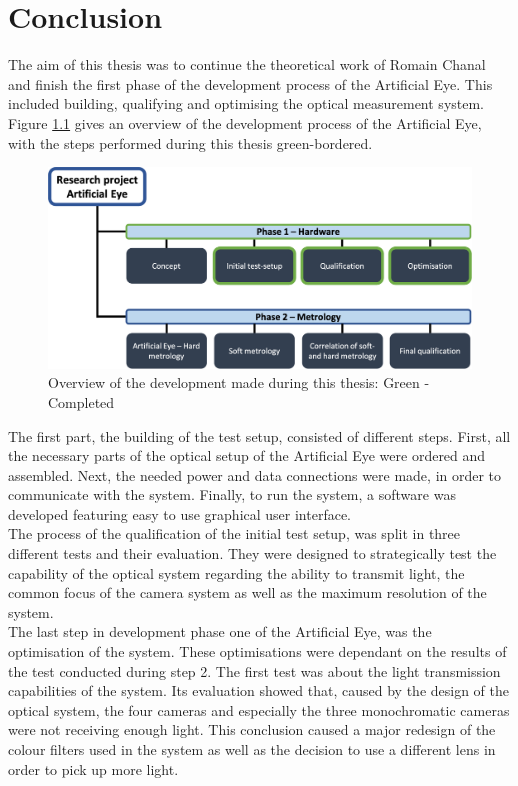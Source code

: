 \chapter{Conclusion}
\label{Conclusion}

The aim of this thesis was to continue the theoretical work of Romain Chanal and finish the first phase of the development process of the Artificial Eye. This included building, qualifying and optimising the optical measurement system. Figure \ref{ChainConclusion} gives an overview of the development process of the Artificial Eye, with the steps performed during this thesis green-bordered.

\begin{figure}[h]
\begin{center}
\includegraphics[width=12cm]{Pictures/ChainConclusion}
\caption[Overview of the development made during this thesis]{Overview of the development made during this thesis: Green - Completed}
\label{ChainConclusion}
\end{center}
\end{figure}

The first part, the building of the test setup, consisted of different steps. First, all the necessary parts of the optical setup of the Artificial Eye were ordered and assembled. Next, the needed power and data connections were made, in order to communicate with the system. Finally, to run the system, a software was developed featuring easy to use graphical user interface.\\

The process of the qualification of the initial test setup, was split in three different tests and their evaluation. They were designed to strategically test the capability of the optical system regarding the ability to transmit light, the common focus of the camera system as well as the maximum resolution of the system.\\

The last step in development phase one of the Artificial Eye, was the optimisation of the system. These optimisations were dependant on the results of the test conducted during step 2. The first test was about the light transmission capabilities of the system. Its evaluation showed that, caused by the design of the optical system, the four cameras and especially the three monochromatic cameras were not receiving enough light. This conclusion caused a major redesign of the colour filters used in the system as well as the decision to use a different lens in order to pick up more light.\\

